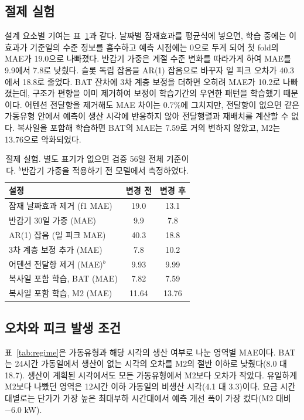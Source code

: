 \subsection{절제 실험}
설계 요소별 기여는 표~\ref{tab:ablation}과 같다. 날짜별 잠재효과를 평균식에 넣으면, 학습 중에는 이 효과가 기준일의 수준 정보를 흡수하고 예측 시점에는 0으로 두게 되어 첫 fold의 MAE가 19.0으로 나빠졌다. 반감기 가중은 계절 수준 변화를 따라가게 하여 MAE를 9.9에서 7.8로 낮췄다. 슬롯 독립 잡음을 AR(1) 잡음으로 바꾸자 일 피크 오차가 40.3에서 18.8로 줄었다. BAT 잔차에 3차 계층 보정을 더하면 오히려 MAE가 10.2로 나빠졌는데, 구조가 편향을 이미 제거하여 보정이 학습기간의 우연한 패턴을 학습했기 때문이다. 어텐션 전달항을 제거해도 MAE 차이는 0.7\%에 그치지만, 전달항이 없으면 같은 가동유형 안에서 예측이 생산 시각에 반응하지 않아 전달행렬과 재배치를 계산할 수 없다. 복사일을 포함해 학습하면 BAT의 MAE는 7.59로 거의 변하지 않았고, M2는 13.76으로 악화되었다.

\begin{table}[t]
\centering
\small
\begin{tabular}{@{}lcc@{}}
\toprule
설정 & 변경 전 & 변경 후 \\
\midrule
잠재 날짜효과 제거 (f1 MAE) & 19.0 & 13.1 \\
반감기 30일 가중 (MAE) & 9.9 & 7.8 \\
AR(1) 잡음 (일 피크 MAE) & 40.3 & 18.8 \\
3차 계층 보정 추가 (MAE) & 7.8 & 10.2 \\
어텐션 전달항 제거 (MAE)$^{b}$ & 9.93 & 9.99 \\
복사일 포함 학습, BAT (MAE) & 7.82 & 7.59 \\
복사일 포함 학습, M2 (MAE) & 11.64 & 13.76 \\
\bottomrule
\end{tabular}
\caption{절제 실험. 별도 표기가 없으면 검증 56일 전체 기준이다. $^{b}$반감기 가중을 적용하기 전 모델에서 측정하였다.}
\label{tab:ablation}
\end{table}

\subsection{오차와 피크 발생 조건}
표~\ref{tab:regime}은 가동유형과 해당 시각의 생산 여부로 나눈 영역별 MAE이다. BAT는 24시간 가동일에서 생산이 없는 시각의 오차를 M2의 절반 이하로 낮췄다(8.0 대 18.7). 생산이 계획된 시각에서도 모든 가동유형에서 M2보다 오차가 작았다. 유일하게 M2보다 나빴던 영역은 12시간 이하 가동일의 비생산 시각(4.1 대 3.3)이다. 요금 시간대별로는 단가가 가장 높은 최대부하 시간대에서 예측 개선 폭이 가장 컸다(M2 대비 $-6.0$ kW).

